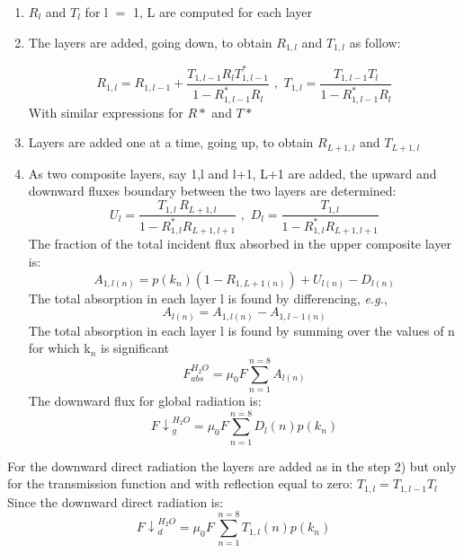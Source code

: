 \begin{enumerate}
\item $R_{l} $ and $T_{l}$ for l $=$ 1, L are computed for each layer
\item The layers are added, going down, to obtain $R_{1,l}$ and $T_{1,l}$ as follow:

\begin{equation}
R_{1,l}=R_{1,l-1}+\frac{T_{1,l-1}R_{l}T_{1,l-1}^{\ast }}{1-R_{1,l-1}^{\ast
}R_{l}}\, \, ,\, \, T_{1,l}=\frac{T_{1,l-1}T_{l}}{1-R_{1,l-1}^{\ast }R_{l}}
\end{equation}
With similar expressions for $R*$ and $T*$
\item Layers are added one at a time, going up, to obtain $R_{L+1,l}$ and $T_{L+1,l}$
\item As two composite layers, say 1,l and l$+$1, L$+$1 are added, the upward and downward fluxes boundary between the two layers are determined:
\begin{equation}
U_{l}=\frac{T_{1,l}{\, R}_{L+1,l}}{1-R_{1,l}^{\ast }R_{L+1,l+1}}\, \, ,\, \,
D_{l}=\frac{T_{1,l}}{1-R_{1,l}^{\ast }R_{L+1,l+1}}
\end{equation}
The fraction of the total incident flux absorbed in the upper composite
layer is:
\begin{equation}
A_{1,l(n)}=p\left( k_{n} \right)\left( 1-R_{1,L+1(n)}
\right)+U_{l(n)}-D_{l(n)}
\end{equation}
The total absorption in each layer l is found by differencing, \emph{e.g.},
\begin{equation}
A_{l(n)}=A_{1,l(n)}-A_{1,l-1(n)}
\end{equation}
The total absorption in each layer l is found by summing over the values of
n for which k$_{n}$ is significant
\begin{equation}
F_{abs}^{H_{2}O}=\mu_{0}F\sum\limits_{n=1}^{n=8} A_{l(n)}
\end{equation}
The downward flux for global radiation is:
\begin{equation}
{F\downarrow }_{g}^{H_{2}O}=\mu_{0}F\sum\limits_{n=1}^{n=8} {D_{l}\left( n
\right)p\left( k_{n} \right)}
\end{equation}
\end{enumerate}
For the downward direct radiation the layers are added as in the step 2) but
only for the transmission function and with reflection equal to zero:
$T_{1,l}=T_{1,l-1}T_{l}$ Since the downward direct radiation is:
\begin{equation}
{F\downarrow }_{d}^{H_{2}O}=\mu_{0}F\, \sum\limits_{n=1}^{n=8} T_{1,l} \left(
n \right)p(k_{n})
\end{equation}


